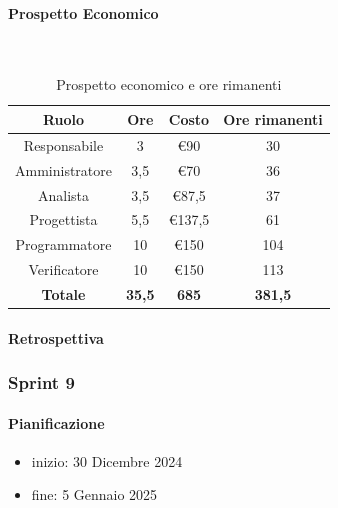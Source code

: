 \documentclass{article}
\begin{document}
                \paragraph{Prospetto Economico}\mbox{}\\
                \begin{table}[H]
                    \centering
                    \begin{tabular}{|c|c|c|c|}
                    \hline
                    \textbf{Ruolo}  & \textbf{Ore}  & \textbf{Costo} & \textbf{Ore rimanenti} \\ \hline
                    Responsabile    & 3             & €90            & 30                     \\ \hline
                    Amministratore  & 3,5           & €70            & 36                   \\ \hline
                    Analista        & 3,5           & €87,5          & 37                   \\ \hline
                    Progettista     & 5,5           & €137,5         & 61                   \\ \hline
                    Programmatore   & 10            & €150           & 104                    \\ \hline
                    Verificatore    & 10            & €150           & 113                    \\ \hline
                    \textbf{Totale} & \textbf{35,5} & \textbf{685}   & \textbf{381,5}         \\ \hline
                    \end{tabular}
                    \caption{Prospetto economico e ore rimanenti}
                \end{table}

                \paragraph{Retrospettiva}
            \subsubsection{Sprint 9}
                \paragraph{Pianificazione}
                \begin{itemize}
                    \item inizio: 30 Dicembre 2024
                    \item fine: 5 Gennaio 2025
                \end{itemize}
\end{document}
